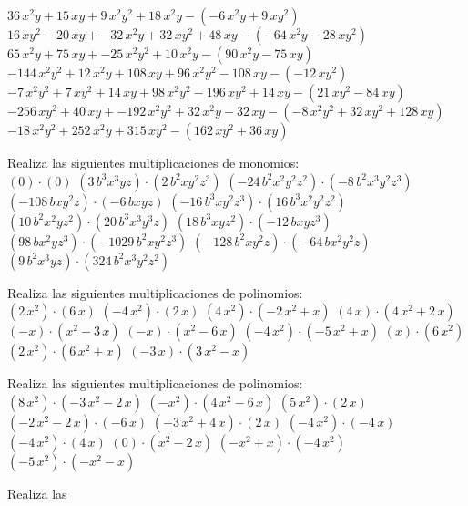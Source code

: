 \subitem [4]\quad$ 36 \, x^{2} y + 15 \, x y + 9 \, x^{2} y^{2} + 18 \, x^{2} y - ( -6 \, x^{2} y + 9 \, x y^{2} ) $ \subitem [5]\quad$ 16 \, x y^{2} - 20 \, x y + -32 \, x^{2} y + 32 \, x y^{2} + 48 \, x y - ( -64 \, x^{2} y - 28 \, x y^{2} ) $ \subitem [6]\quad$ 65 \, x^{2} y + 75 \, x y + -25 \, x^{2} y^{2} + 10 \, x^{2} y - ( 90 \, x^{2} y - 75 \, x y ) $ \subitem [7]\quad$ -144 \, x^{2} y^{2} + 12 \, x^{2} y + 108 \, x y + 96 \, x^{2} y^{2} - 108 \, x y - ( -12 \, x y^{2} ) $ \subitem [8]\quad$ -7 \, x^{2} y^{2} + 7 \, x y^{2} + 14 \, x y + 98 \, x^{2} y^{2} - 196 \, x y^{2} + 14 \, x y - ( 21 \, x y^{2} - 84 \, x y ) $ \subitem [9]\quad$ -256 \, x y^{2} + 40 \, x y + -192 \, x^{2} y^{2} + 32 \, x^{2} y - 32 \, x y - ( -8 \, x^{2} y^{2} + 32 \, x y^{2} + 128 \, x y ) $ \subitem [10]\quad$ -18 \, x^{2} y^{2} + 252 \, x^{2} y + 315 \, x y^{2} - ( 162 \, x y^{2} + 36 \, x y ) $ \item[Ejercicio 3:] Realiza las siguientes multiplicaciones de monomios: \\ \subitem [1]\quad$ ( 0 ) · ( 0 )$ \subitem [2]\quad$ ( 3 \, b^{3} x^{3} y z ) · ( 2 \, b^{2} x y^{2} z^{3} )$ \subitem [3]\quad$ ( -24 \, b^{2} x^{2} y^{2} z^{2} ) · ( -8 \, b^{2} x^{3} y^{2} z^{3} )$ \subitem [4]\quad$ ( -108 \, b x y^{2} z ) · ( -6 \, b x y z )$ \subitem [5]\quad$ ( -16 \, b^{3} x y^{2} z^{3} ) · ( 16 \, b^{3} x^{2} y^{2} z^{2} )$ \subitem [6]\quad$ ( 10 \, b^{2} x^{2} y z^{2} ) · ( 20 \, b^{3} x^{3} y^{3} z )$ \subitem [7]\quad$ ( 18 \, b^{3} x y z^{2} ) · ( -12 \, b x y z^{3} )$ \subitem [8]\quad$ ( 98 \, b x^{2} y z^{3} ) · ( -1029 \, b^{2} x y^{2} z^{3} )$ \subitem [9]\quad$ ( -128 \, b^{2} x y^{2} z ) · ( -64 \, b x^{2} y^{2} z )$ \subitem [10]\quad$ ( 9 \, b^{2} x^{3} y z ) · ( 324 \, b^{2} x^{3} y^{2} z^{2} )$ \item[Ejercicio 4:] Realiza las siguientes multiplicaciones de polinomios: \\ \subitem [1]\quad$ ( 2 \, x^{2} ) · ( 6 \, x )$ \subitem [2]\quad$ ( -4 \, x^{2} ) · ( 2 \, x )$ \subitem [3]\quad$ ( 4 \, x^{2} ) · ( -2 \, x^{2} + x )$ \subitem [4]\quad$ ( 4 \, x ) · ( 4 \, x^{2} + 2 \, x )$ \subitem [5]\quad$ ( -x ) · ( x^{2} - 3 \, x )$ \subitem [6]\quad$ ( -x ) · ( x^{2} - 6 \, x )$ \subitem [7]\quad$ ( -4 \, x^{2} ) · ( -5 \, x^{2} + x )$ \subitem [8]\quad$ ( x ) · ( 6 \, x^{2} )$ \subitem [9]\quad$ ( 2 \, x^{2} ) · ( 6 \, x^{2} + x )$ \subitem [10]\quad$ ( -3 \, x ) · ( 3 \, x^{2} - x )$ \item[Ejercicio 5:] Realiza las siguientes multiplicaciones de polinomios: \\ \subitem [1]\quad$ ( 8 \, x^{2} ) · ( -3 \, x^{2} - 2 \, x )$ \subitem [2]\quad$ ( -x^{2} ) · ( 4 \, x^{2} - 6 \, x )$ \subitem [3]\quad$ ( 5 \, x^{2} ) · ( 2 \, x )$ \subitem [4]\quad$ ( -2 \, x^{2} - 2 \, x ) · ( -6 \, x )$ \subitem [5]\quad$ ( -3 \, x^{2} + 4 \, x ) · ( 2 \, x )$ \subitem [6]\quad$ ( -4 \, x^{2} ) · ( -4 \, x )$ \subitem [7]\quad$ ( -4 \, x^{2} ) · ( 4 \, x )$ \subitem [8]\quad$ ( 0 ) · ( x^{2} - 2 \, x )$ \subitem [9]\quad$ ( -x^{2} + x ) · ( -4 \, x^{2} )$ \subitem [10]\quad$ ( -5 \, x^{2} ) · ( -x^{2} - x )$ \item[Ejercicio 6:] Realiza las 